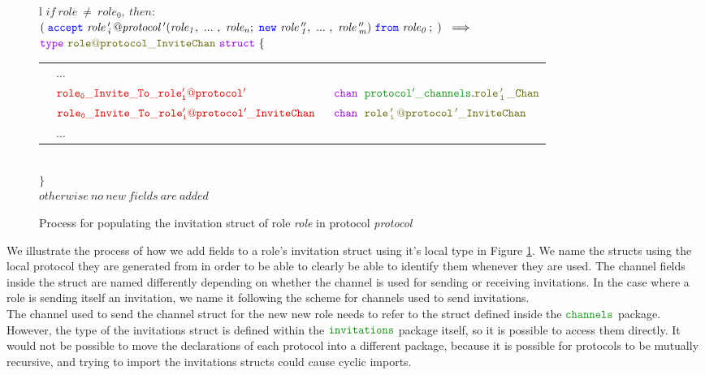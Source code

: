 \documentclass[12pt,twoside]{report}
\begin{document}
\begin{figure}[!h]
\begin{center}
\begin{tabular}{l}
            $\mathit{if\ role\ \neq\ role_0},\ then:$\\[6pt]
            $(\;\accept\ \mathit{\localprotocol{role\,'_i\,}{protocol}\,'}(\roles{role}{n};\ \scrnew\ \roles{role\,''}{m})\ \from\ \mathit{role_0}\,;\;)\ \implies$\\[6pt]
            $\gotype\ \structname{\localprotocol{role}{protocol}\_InviteChan}\ \gostruct\ \{$\\[3pt]
            \begin{tabular}{lll}
                \indent & $\dots$ & \\[9pt]
                \indent & $\structfield{role_0\_Invite\_To\_\localprotocol{role'_i}{protocol'}}$\ &$\gochan\ \;\pkgstructaccess{protocol'\_channels}{role\,'_i\,\_Chan}$\\
                \indent & $\structfield{role_0\_Invite\_To\_\localprotocol{role'_i}{protocol'}\_InviteChan}$\ &$\gochan\ \; \structname{\localprotocol{role\,'_i\,}{protocol\,'}\_InviteChan}$\\
                [7pt]
                \indent & $\dots$ & 
            \end{tabular}\\
            $\}$\\[6pt]
            
            $\mathit{otherwise\ no\ new\ fields\ are\ added}$
            
        \end{tabular}
    \end{center}
    \caption{Process for populating the invitation struct of role \textit{role} in protocol \textit{protocol}}
    \label{invitation-struct-gen}
\end{figure}

We illustrate the process of how we add fields to a role's invitation struct using it's local type in Figure \ref{invitation-struct-gen}. We name the structs using the local protocol they are generated from in order to be able to clearly be able to identify them whenever they are used. The channel fields inside the struct are named differently depending on whether the channel is used for sending or receiving invitations. In the case where a role is sending itself an invitation, we name it following the scheme for channels used to send invitations.\\

The channel used to send the channel struct for the new new role needs to refer to the struct defined inside the $\pkgname{channels}$ package. However, the type of the invitations struct is defined within the $\pkgname{invitations}$ package itself, so it is possible to access them directly. It would not be possible to move the declarations of each protocol into a different package, because it is possible for protocols to be mutually recursive, and trying to import the invitations structs could cause cyclic imports.
\end{document}
